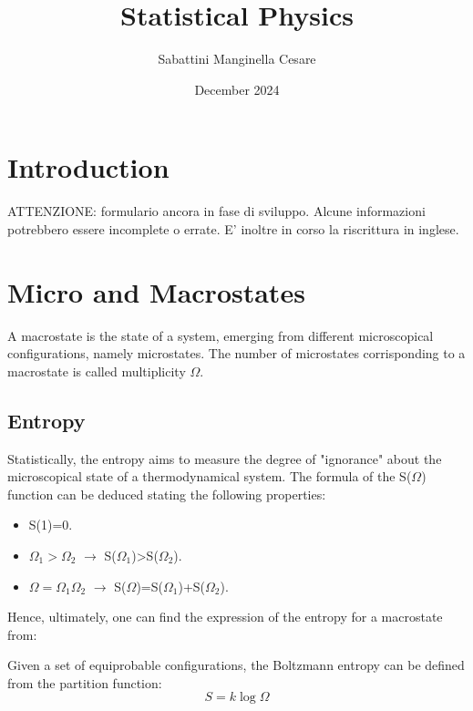 \documentclass{article}
\title{Statistical Physics}
\author{Sabattini Manginella Cesare}
\date{December 2024}
\begin{document}
\maketitle

\tableofcontents

\newpage

\section{Introduction}
ATTENZIONE: formulario ancora in fase di sviluppo. Alcune informazioni potrebbero essere incomplete o errate.
E' inoltre in corso la riscrittura in inglese.

\newpage

\section{Micro and Macrostates}
A macrostate is the state of a system, emerging from different microscopical configurations, namely microstates.
The number of microstates corrisponding to a macrostate is called multiplicity $\Omega$.

\subsection{Entropy}
Statistically, the entropy aims to measure the degree of "ignorance" about the microscopical state of a thermodynamical system.
The formula of the S($\Omega$) function can be deduced stating the following properties:

\begin{itemize}
    \item S(1)=0.
    \item $\Omega_1>\Omega_2$ $\rightarrow$ S($\Omega_1$)>S($\Omega_2$).
    \item $\Omega=\Omega_1\Omega_2$ $\rightarrow$ S($\Omega$)=S($\Omega_1$)+S($\Omega_2$).
\end{itemize}

Hence, ultimately, one can find the expression of the entropy for a macrostate from:

\begin{tcolorbox}[colframe=gray!50, colback=gray!10, coltitle=black, title=Boltzmann Entropy]
    Given a set of equiprobable configurations, the Boltzmann entropy can be defined from the partition function:
    \begin{equation}
        S = k \log \Omega
    \end{equation}
\end{tcolorbox}
\end{document}
